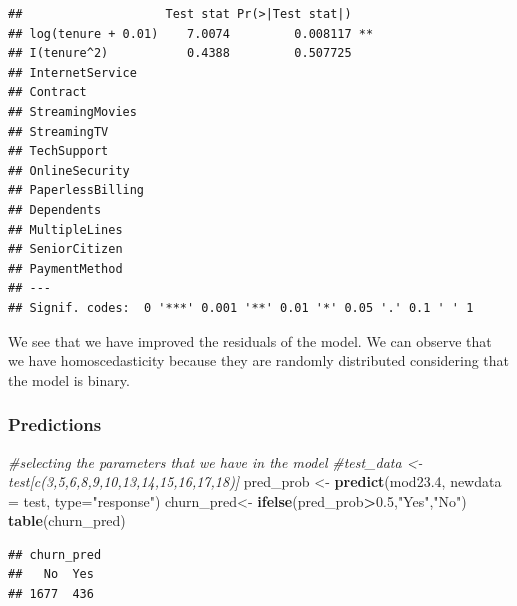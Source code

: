 \documentclass[
  twoside]{article}
\newenvironment{Shaded}{\begin{snugshade}}{\end{snugshade}}
\newcommand{\AttributeTok}[1]{\textcolor[rgb]{0.13,0.29,0.53}{#1}}
\newcommand{\CommentTok}[1]{\textcolor[rgb]{0.56,0.35,0.01}{\textit{#1}}}
\newcommand{\FloatTok}[1]{\textcolor[rgb]{0.00,0.00,0.81}{#1}}
\newcommand{\FunctionTok}[1]{\textcolor[rgb]{0.13,0.29,0.53}{\textbf{#1}}}
\newcommand{\NormalTok}[1]{#1}
\newcommand{\OtherTok}[1]{\textcolor[rgb]{0.56,0.35,0.01}{#1}}
\newcommand{\SpecialCharTok}[1]{\textcolor[rgb]{0.81,0.36,0.00}{\textbf{#1}}}
\newcommand{\StringTok}[1]{\textcolor[rgb]{0.31,0.60,0.02}{#1}}
\begin{document}
\begin{verbatim}
##                    Test stat Pr(>|Test stat|)   
## log(tenure + 0.01)    7.0074         0.008117 **
## I(tenure^2)           0.4388         0.507725   
## InternetService                                 
## Contract                                        
## StreamingMovies                                 
## StreamingTV                                     
## TechSupport                                     
## OnlineSecurity                                  
## PaperlessBilling                                
## Dependents                                      
## MultipleLines                                   
## SeniorCitizen                                   
## PaymentMethod                                   
## ---
## Signif. codes:  0 '***' 0.001 '**' 0.01 '*' 0.05 '.' 0.1 ' ' 1
\end{verbatim}

We see that we have improved the residuals of the model. We can observe
that we have homoscedasticity because they are randomly distributed
considering that the model is binary.

\hypertarget{predictions}{%
\subsubsection{Predictions}\label{predictions}}

\begin{Shaded}
\begin{Highlighting}[]
\CommentTok{\#selecting the parameters that we have in the model}
\CommentTok{\#test\_data \textless{}{-} test[c(3,5,6,8,9,10,13,14,15,16,17,18)]}
\NormalTok{pred\_prob }\OtherTok{\textless{}{-}} \FunctionTok{predict}\NormalTok{(mod23}\FloatTok{.4}\NormalTok{, }\AttributeTok{newdata =}\NormalTok{ test, }\AttributeTok{type=}\StringTok{"response"}\NormalTok{)}
\NormalTok{churn\_pred}\OtherTok{\textless{}{-}} \FunctionTok{ifelse}\NormalTok{(pred\_prob}\SpecialCharTok{\textgreater{}}\FloatTok{0.5}\NormalTok{,}\StringTok{"Yes"}\NormalTok{,}\StringTok{"No"}\NormalTok{)}
\FunctionTok{table}\NormalTok{(churn\_pred)}
\end{Highlighting}
\end{Shaded}

\begin{verbatim}
## churn_pred
##   No  Yes 
## 1677  436
\end{verbatim}

\begin{Shaded}
\end{Shaded}
\end{document}
